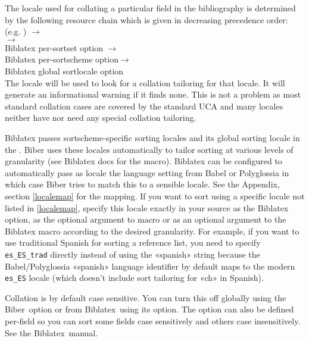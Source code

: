 \documentclass{ltxdockit}
\newcommand*{\biber}{Biber\xspace}
\newcommand*{\biblatex}{Biblatex\xspace}
\begin{document}
The locale used for collating a particular field in the bibliography is
determined by the following resource chain which is given
in decreasing precedence order:\\[2ex]

\noindent{} (e.g. ) $\rightarrow$\\
\hspace*{1em} $\rightarrow$\\
\hspace*{2em}\biblatex per-sortset  option $\rightarrow$\\
\hspace*{3em}\biblatex per-sortscheme  option$\rightarrow$\\
\hspace*{4em}\biblatex global sortlocale option\\

\noindent The locale will be used to look for a collation tailoring for
that locale. It will generate an informational warning if it finds none.
This is not a problem as most standard collation cases are covered by the
standard UCA and many locales neither have nor need any special collation
tailoring.

\biblatex passes sortscheme-specific sorting locales and its global sorting
locale in the . \biber uses these locales automatically to
tailor sorting at various levels of granularity (see \biblatex docs for the
 macro). \biblatex can be configured to
automatically pass as locale the language setting from Babel or Polyglossia
in which case \biber tries to match this to a sensible locale. See the
Appendix, section \ref{localemap} for the mapping. If you want to sort
using a specific locale not listed in \ref{localemap}, specify this locale
exactly in your \latex source as the \biblatex {} option, as
the optional argument to  macro or as an optional
argument to the \biblatex {} macro according to the desired
granularity. For example, if you want to use traditional Spanish for
sorting a reference list, you need to specify \verb+es_ES_trad+ directly
instead of using the «spanish» string because the Babel/Polyglossia
«spanish» language identifier by default maps to the modern \verb+es_ES+
locale (which doesn't include sort tailoring for «ch» in Spanish).

Collation is by default case sensitive. You can turn this
off globally using the \biber\ option  or from
\biblatex\ using its option\linebreak[4]. The option can also
be defined per-field so you can sort some fields case sensitively and
others case insensitively. See the \biblatex\ manual.
\end{document}
